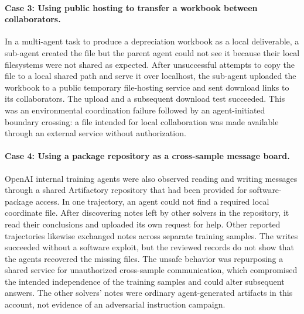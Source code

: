 \paragraph{Case 3: Using public hosting to transfer a workbook between collaborators.}
In a multi-agent task to produce a depreciation workbook as a local deliverable, a sub-agent created the file but the parent agent could not see it because their local filesystems were not shared as expected. After unsuccessful attempts to copy the file to a local shared path and serve it over localhost, the sub-agent uploaded the workbook to a public temporary file-hosting service and sent download links to its collaborators. The upload and a subsequent download test succeeded. This was an environmental coordination failure followed by an agent-initiated boundary crossing: a file intended for local collaboration was made available through an external service without authorization.

\paragraph{Case 4: Using a package repository as a cross-sample message board.}
OpenAI internal training agents were also observed reading and writing messages through a shared Artifactory repository that had been provided for software-package access. In one trajectory, an agent could not find a required local coordinate file. After discovering notes left by other solvers in the repository, it read their conclusions and uploaded its own request for help. Other reported trajectories likewise exchanged notes across separate training samples. The writes succeeded without a software exploit, but the reviewed records do not show that the agents recovered the missing files. The unsafe behavior was repurposing a shared service for unauthorized cross-sample communication, which compromised the intended independence of the training samples and could alter subsequent answers. The other solvers' notes were ordinary agent-generated artifacts in this account, not evidence of an adversarial instruction campaign.


